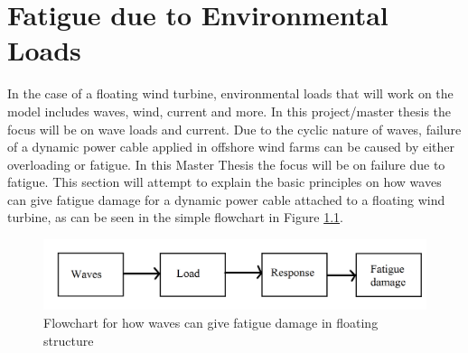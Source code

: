 \chapter{Fatigue due to Environmental Loads}
\label{chap:fatigue}
In the case of a floating wind turbine, environmental loads that will work on the model includes waves, wind, current and more. In this project/master thesis the focus will be on wave loads and current. Due to the cyclic nature of waves, failure of a dynamic power cable applied in offshore wind farms can be caused by either overloading or fatigue. In this Master Thesis the focus will be on failure due to fatigue. This section will attempt to explain the basic principles on how waves can give fatigue damage for a dynamic power cable attached to a floating wind turbine, as can be seen in the simple flowchart in Figure \ref{fig:flowchart}. 

\begin{figure}[h!]
\centering
\includegraphics[scale=0.75]{figures/box}
\caption[$\; \:$Flowchart]{Flowchart for how waves can give fatigue damage in floating structure}
 \label{fig:flowchart}
\end{figure}

